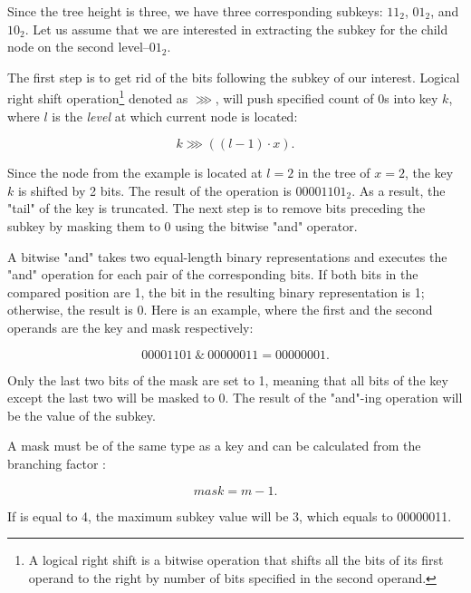 Since the tree height is three, we have three corresponding subkeys: $11_2$, $01_2$, and $10_2$. Let us assume that we are interested in extracting the subkey for the child node on the second level--$01_2$.

The first step is to get rid of the bits following the subkey of our interest. Logical right shift operation\footnote{A logical right shift is a bitwise operation that shifts all the bits of its first operand to the right by number of bits specified in the second operand.} denoted as $\ggg$, will push specified count of 0s into key $k$, where $l$ is the \emph{level} at which current node is located:

\begin{equation}
    k \ggg ((l - 1) \cdot x).
\end{equation}

Since the node from the example is located at $l = 2$ in the tree of $x = 2$, the key $k$ is shifted by 2 bits. The result of the operation is $00001101_2$. As a result, the "tail" of the key is truncated. The next step is to remove bits preceding the subkey by masking them to 0 using the bitwise "and" operator.

A bitwise "and" takes two equal-length binary representations and executes the "and" operation for each pair of the corresponding bits. If both bits in the compared position are 1, the bit in the resulting binary representation is 1; otherwise, the result is 0. Here is an example, where the first and the second operands are the key and mask respectively:

\begin{equation}
    00001101 \ \& \ 00000011 = 00000001.
\end{equation}

Only the last two bits of the mask are set to 1, meaning that all bits of the key except the last two will be masked to 0. The result of the "and"-ing operation will be the value of the subkey.

A mask must be of the same type as a key and can be calculated from the branching factor \m{}:

\begin{equation}
    \mathit{mask} = m - 1.
\end{equation}

If \m{} is equal to 4, the maximum subkey value will be 3, which equals to 00000011.

